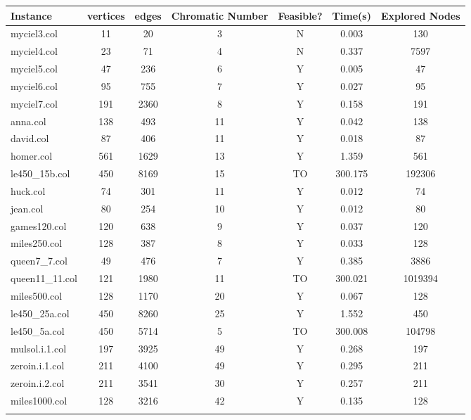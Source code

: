 \documentclass{article}
\begin{document}
\begin{center}
\renewcommand{\arraystretch}{1.4}
 \begin{tabular}{lcccccc}
	\hline
\textbf{Instance}  & \textbf{vertices} & \textbf{edges}  & \textbf{Chromatic Number} & \textbf{Feasible?} & \textbf{Time(s)} & \textbf{Explored Nodes} \\\hline

myciel3.col & 11 & 20 & 3 & N & 0.003 & 130 \\ 
myciel4.col & 23 & 71 & 4 & N & 0.337 & 7597 \\ 
myciel5.col & 47 & 236 & 6 & Y & 0.005 & 47 \\ 
myciel6.col & 95 & 755 & 7 & Y & 0.027 & 95 \\ 
myciel7.col & 191 & 2360 & 8 & Y & 0.158 & 191 \\ 
anna.col & 138 & 493 & 11 & Y & 0.042 & 138 \\ 
david.col & 87 & 406 & 11 & Y & 0.018 & 87 \\ 
homer.col & 561 & 1629 & 13 & Y & 1.359 & 561 \\ 
le450\_15b.col & 450 & 8169 & 15 & TO & 300.175 & 192306 \\ 
huck.col & 74 & 301 & 11 & Y & 0.012 & 74 \\ 
jean.col & 80 & 254 & 10 & Y & 0.012 & 80 \\ 
games120.col & 120 & 638 & 9 & Y & 0.037 & 120 \\ 
miles250.col & 128 & 387 & 8 & Y & 0.033 & 128 \\ 
queen7\_7.col & 49 & 476 & 7 & Y & 0.385 & 3886 \\ 
queen11\_11.col & 121 & 1980 & 11 & TO & 300.021 & 1019394 \\ 
miles500.col & 128 & 1170 & 20 & Y & 0.067 & 128 \\ 
le450\_25a.col & 450 & 8260 & 25 & Y & 1.552 & 450 \\ 
le450\_5a.col & 450 & 5714 & 5 & TO & 300.008 & 104798 \\ 
mulsol.i.1.col & 197 & 3925 & 49 & Y & 0.268 & 197 \\ 
zeroin.i.1.col & 211 & 4100 & 49 & Y & 0.295 & 211 \\ 
zeroin.i.2.col & 211 & 3541 & 30 & Y & 0.257 & 211 \\ 
miles1000.col & 128 & 3216 & 42 & Y & 0.135 & 128 \\ 

\\
\hline\end{tabular}
\end{center}
\end{document}
